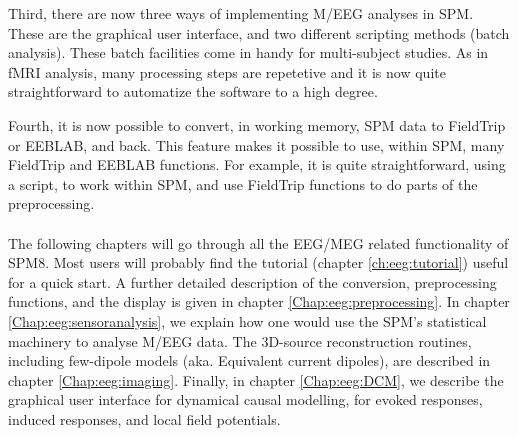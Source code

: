 Third, there are now three ways of implementing M/EEG analyses in SPM. These are the graphical user interface, and two different scripting methods (batch analysis). These batch facilities come in handy for multi-subject studies. As in fMRI analysis, many processing steps are repetetive and it is now quite straightforward to automatize the software to a high degree.

Fourth, it is now possible to convert, in working memory, SPM data to FieldTrip or EEBLAB, and back. This feature makes it possible to use, within SPM, many FieldTrip and EEBLAB functions. For example, it is quite straightforward, using a script, to work within SPM, and use FieldTrip functions to do parts of the preprocessing.
\\
\\
The following chapters will go through all the EEG/MEG related functionality of SPM8. Most users will probably find the tutorial (chapter \ref{ch:eeg:tutorial}) useful for a quick start. A further detailed description of the conversion, preprocessing functions, and the display is given in chapter \ref{Chap:eeg:preprocessing}. In chapter \ref{Chap:eeg:sensoranalysis}, we explain how one would use the SPM's statistical machinery to analyse M/EEG data. The 3D-source reconstruction routines, including few-dipole models (aka. Equivalent current dipoles), are described in chapter \ref{Chap:eeg:imaging}. Finally, in chapter \ref{Chap:eeg:DCM}, we describe the graphical user interface for dynamical causal modelling, for evoked responses, induced responses, and local field potentials.
